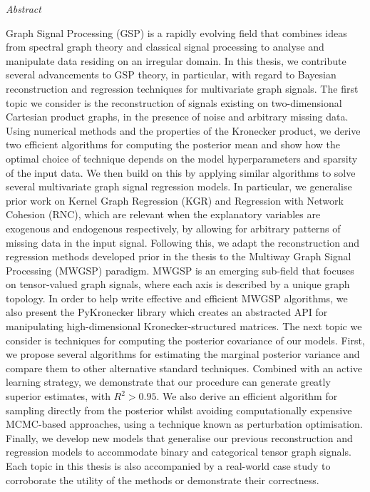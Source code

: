 \pagestyle{empty}



\begin{center}
    \hspace{-1cm}
    {\LARGE{\textit{Abstract}}}
\end{center}
 

Graph Signal Processing (GSP) is a rapidly evolving field that combines ideas from spectral graph theory and classical signal processing to analyse and manipulate data residing on an irregular domain. In this thesis, we contribute several advancements to GSP theory, in particular, with regard to Bayesian reconstruction and regression techniques for multivariate graph signals. The first topic we consider is the reconstruction of signals existing on two-dimensional Cartesian product graphs, in the presence of noise and arbitrary missing data. Using numerical methods and the properties of the Kronecker product, we derive two efficient algorithms for computing the posterior mean and show how the optimal choice of technique depends on the model hyperparameters and sparsity of the input data. We then build on this by applying similar algorithms to solve several multivariate graph signal regression models. In particular, we generalise prior work on Kernel Graph Regression (KGR) and Regression with Network Cohesion (RNC), which are relevant when the explanatory variables are exogenous and endogenous respectively, by allowing for arbitrary patterns of missing data in the input signal. Following this, we adapt the reconstruction and regression methods developed prior in the thesis to the Multiway Graph Signal Processing (MWGSP) paradigm. MWGSP is an emerging sub-field that focuses on tensor-valued graph signals, where each axis is described by a unique graph topology. In order to help write effective and efficient MWGSP algorithms, we also present the PyKronecker library which creates an abstracted API for manipulating high-dimensional Kronecker-structured matrices. The next topic we consider is techniques for computing the posterior covariance of our models. First, we propose several algorithms for estimating the marginal posterior variance and compare them to other alternative standard techniques. Combined with an active learning strategy, we demonstrate that our procedure can generate greatly superior estimates, with $R^2 > 0.95$. We also derive an efficient algorithm for sampling directly from the posterior whilst avoiding computationally expensive MCMC-based approaches, using a technique known as perturbation optimisation. Finally, we develop new models that generalise our previous reconstruction and regression models to accommodate binary and categorical tensor graph signals. Each topic in this thesis is also accompanied by a real-world case study to corroborate the utility of the methods or demonstrate their correctness. 


\clearpage %